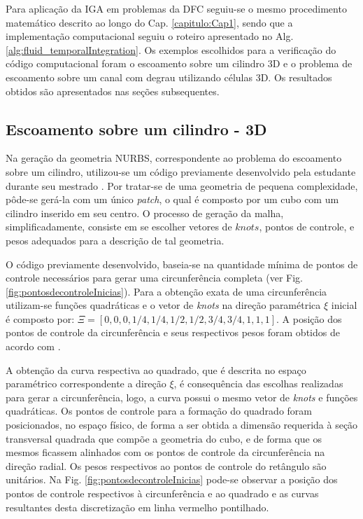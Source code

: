 \documentclass[tese_patricia]{subfiles}
\begin{document}
Para aplicação da IGA em problemas da DFC seguiu-se o mesmo procedimento matemático descrito ao longo do Cap. \ref{capitulo:Cap1}, sendo que a implementação computacional seguiu o roteiro apresentado no Alg. \ref{alg:fluid_temporalIntegration}. Os exemplos escolhidos para a verificação do código computacional foram o escoamento sobre um cilindro 3D e o problema de escoamento sobre um canal com degrau utilizando células 3D. Os resultados obtidos são apresentados nas seções subsequentes.

\subsection {Escoamento sobre um cilindro - 3D}

Na geração da geometria NURBS, correspondente ao problema do escoamento sobre um cilindro, utilizou-se um código previamente desenvolvido pela estudante durante seu mestrado \cite{Tonon:2016}. Por tratar-se de uma geometria de pequena complexidade, pôde-se gerá-la com um único \textit{patch}, o qual é composto por um cubo com um cilindro inserido em seu centro.
O processo de geração da malha, simplificadamente, consiste em se escolher vetores de $knots$, pontos de controle, e pesos adequados para a descrição de tal geometria.

O código previamente desenvolvido, baseia-se na quantidade mínima de pontos de controle necessários para gerar uma circunferência completa (ver Fig. \ref{fig:pontosdecontroleInicias}). Para a obtenção exata de uma circunferência utilizam-se funções quadráticas e o vetor de \textit {knots} na direção paramétrica $\xi$ inicial é composto por: $\Xi=\left[0,0,0,1/4,1/4,1/2,1/2,3/4,3/4,1,1,1\right]$. A posição dos pontos de controle da circunferência e seus respectivos pesos foram obtidos de acordo com . 

A obtenção da curva respectiva ao quadrado, que é descrita no espaço paramétrico correspondente a direção $\xi$, é consequência das escolhas realizadas para gerar a circunferência, logo, a curva possui o mesmo vetor de \textit{knots} e funções quadráticas. Os pontos de controle para a formação do quadrado foram posicionados, no espaço físico, de forma a ser obtida a dimensão requerida à seção transversal quadrada que compõe a geometria do cubo, e de forma que os mesmos ficassem alinhados com os pontos de controle da circunferência na direção radial. Os pesos respectivos ao pontos de controle do retângulo são unitários. Na Fig. \ref{fig:pontosdecontroleInicias} pode-se observar a posição dos pontos de controle respectivos à circunferência e ao quadrado e as curvas resultantes desta discretização em linha vermelho pontilhado.
\end{document}
